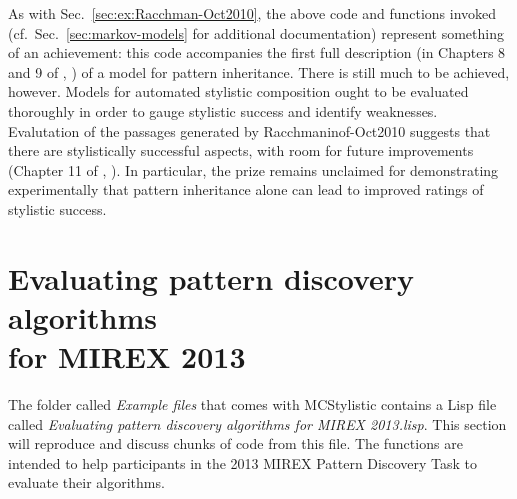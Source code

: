 As with Sec.~\ref{sec:ex:Racchman-Oct2010}, the above code and functions invoked (cf.~Sec.~\ref{sec:markov-models} for additional documentation) represent something of an achievement: this code accompanies the first full description (in Chapters 8 and 9 of \citeauthor{collins2011b}, \citeyear{collins2011b}) of a model for pattern inheritance. There is still much to be achieved, however. Models for automated stylistic composition ought to be evaluated thoroughly in order to gauge stylistic success and identify weaknesses. Evalutation of the passages generated by Racchmaninof-Oct2010 suggests that there are stylistically successful aspects, with room for future improvements (Chapter 11 of \citeauthor{collins2011b}, \citeyear{collins2011b}). In particular, the prize remains unclaimed for demonstrating experimentally that pattern inheritance alone can lead to improved ratings of stylistic success.


\section[Evaluating pattern discovery algorithms for MIREX 2013]{Evaluating pattern discovery algorithms\\ for MIREX 2013}\label{sec:eval-mirex-patt-disc}

The folder called \emph{Example files} that comes with MCStylistic contains a Lisp file called \emph{Evaluating pattern discovery algorithms for MIREX 2013.lisp}. This section will reproduce and discuss chunks of code from this file. The functions are intended to help participants in the 2013 MIREX
Pattern Discovery Task to evaluate their algorithms.

